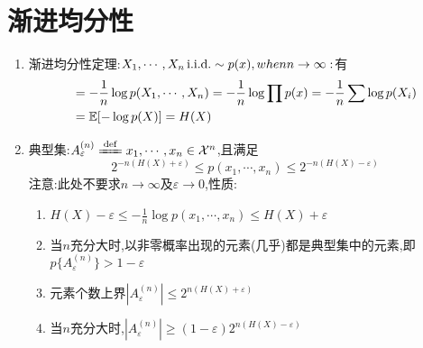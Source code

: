 \documentclass{article}
\begin{document}
\section{渐进均分性}
\begin{enumerate}[label=(\arabic*)]
	\item 渐进均分性定理:$X_1,\cdots ,X_n\mathop{}\!\mathrm{i.i.d.} \sim p(x),when n\to \infty:$有
				\[\begin{aligned}
					&= -\frac{1}{n}\log p(X_1,\cdots ,X_n) = -\frac{1}{n}\log \prod p(x) = -\frac{1}{n}\sum \log p(X_i)\\
					&= \mathbb{E}[-\log p(X)] = H(X)
				\end{aligned}\]
	\item 典型集:$A_{\varepsilon}^{(n)}\defeq x_1,\cdots ,x_n\in \mathcal{X}^n$,且满足
				\[2^{-n(H(X)+\varepsilon)}\leq p(x_1,\cdots ,x_n)\leq 2^{-n(H(X)-\varepsilon)}\]
				{\red 注意:}此处不要求$n\to \infty$及$\varepsilon \to 0$,性质:
				\begin{enumerate}[label=(\alph*)]
					\item $H(X)-\varepsilon \leq -\frac{1}{n}\log p(x_1,\cdots ,x_n)\leq H(X)+\varepsilon$
					\item 当$n$充分大时,以非零概率出现的元素(几乎)都是典型集中的元素,即$p\{A_{\varepsilon}^{(n)}\}>1-\varepsilon$
					\item 元素个数上界$|A_{\varepsilon}^{(n)}|\leq 2^{n(H(X)+\varepsilon)}$
					\item 当$n$充分大时,$|A_{\varepsilon}^{(n)}|\geq (1-\varepsilon)2^{n(H(X)-\varepsilon)}$
				\end{enumerate}
\end{enumerate}
\end{document}
